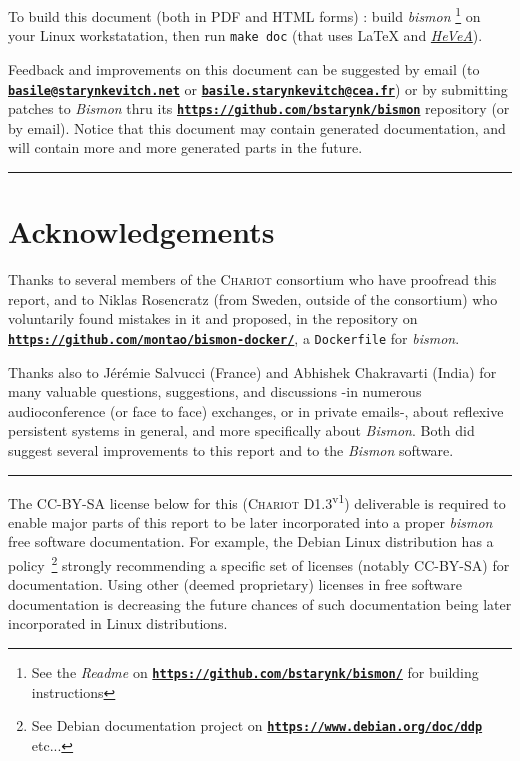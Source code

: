 \documentclass[11pt,a4paper,svgnames]{article}
\newcommand{\bmemail}[1]{{\href{mailto:#1}{\texttt{\textbf{#1}}}}}
\newcommand{\bmurl}[1]{{\href{#1}{\texttt{\textbf{#1}}}}}
\begin{document}
\begin{center}
\begin{boxedminipage}{0.9\textwidth}

To build this document (both in PDF and HTML forms) : build
\emph{bismon} \footnote{See the \emph{Readme} on
  \bmurl{https://github.com/bstarynk/bismon/} for building
  instructions} on your Linux workstatation, then run \texttt{make
  doc} (that uses {\LaTeX} and
\href{http://hevea.inria.fr/}{\emph{HeVeA}}).

Feedback and improvements on this document can be suggested by email
(to \bmemail{basile@starynkevitch.net} or
\bmemail{basile.starynkevitch@cea.fr}) or by submitting patches to
\textit{Bismon} thru its \bmurl{https://github.com/bstarynk/bismon} repository
(or by email). Notice that this document may contain generated
documentation, and will contain more and more generated parts in the
future.
\end{boxedminipage}
\end{center}

\bigskip

\hrule

\bigskip

\section*{Acknowledgements}

Thanks to several members of the \textsc{Chariot} consortium who have
proofread this report, and to Niklas Rosencratz (from Sweden, outside
of the consortium) who voluntarily found mistakes in it and proposed,
in the repository on \bmurl{https://github.com/montao/bismon-docker/},
a \texttt{Dockerfile} for \emph{bismon}.

Thanks also to Jérémie Salvucci (France) and Abhishek Chakravarti
(India) for many valuable questions, suggestions, and discussions -in
numerous audioconference (or face to face) exchanges, or in private
emails-, about reflexive persistent systems in general, and more
specifically about \emph{Bismon}. Both did suggest several
improvements to this report and to the \emph{Bismon} software.

\medskip

\hrule 

\medskip

\vspace{2cm}

\bigskip

The CC-BY-SA license below for this (\textsc{Chariot}
D1.3\textsuperscript{v1}) deliverable is required to enable major parts
of this report to be later incorporated into a proper
\emph{bismon} free software documentation. For example, the Debian
Linux distribution has a policy~\footnote{See Debian documentation
  project on \bmurl{https://www.debian.org/doc/ddp} etc...} strongly
recommending a specific set of licenses (notably CC-BY-SA) for
documentation. Using other (deemed proprietary) licenses in free
software documentation is decreasing the future chances of such
documentation being later incorporated in Linux distributions.
\end{document}
